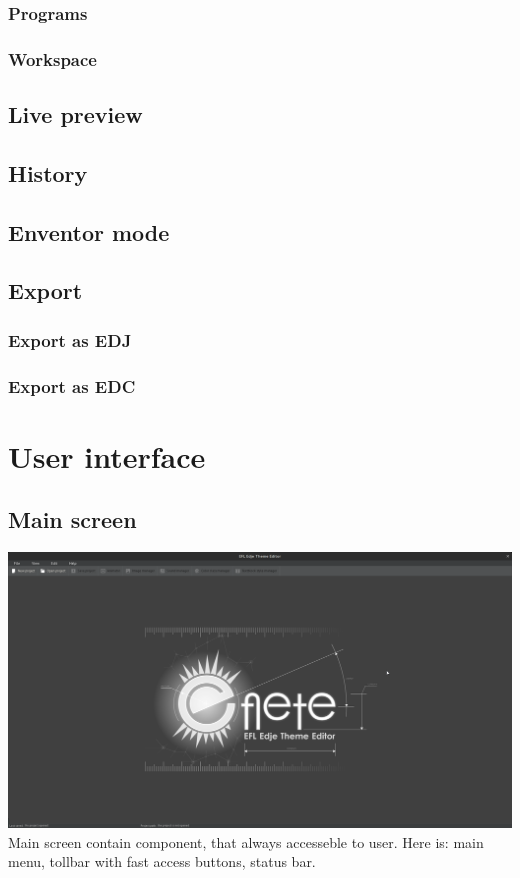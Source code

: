 \documentclass[titlepage,oneside,11pt]{book}
\begin{document}
\subsection{Programs}
\subsection{Workspace}
\section{Live preview}
\section{History}
\section{Enventor mode}
\section{Export}
\subsection{Export as EDJ}
\subsection{Export as EDC}
\chapter{User interface}
\section{Main screen}
\includegraphics[scale=0.2]{images/main_screen.png}
Main screen contain component, that always accesseble to user. Here is: main menu, tollbar with fast access buttons, status bar.
\end{document}
